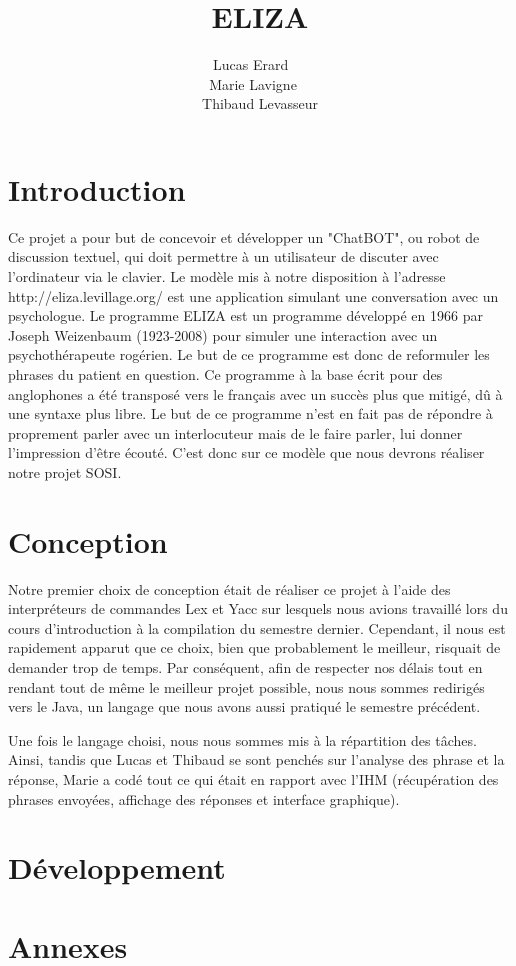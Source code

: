 \documentclass[a4paper,12pt]{article}
\title{ELIZA}
\author{Lucas Erard ~~\\ Marie Lavigne~~\\ Thibaud Levasseur}
\begin{document}
\maketitle
\newpage
\tableofcontents
\newpage
\section{Introduction}
Ce projet a pour but de concevoir et développer un "ChatBOT", ou robot de discussion textuel, qui doit permettre à un utilisateur de discuter avec l'ordinateur via le clavier. Le modèle mis à notre disposition à l'adresse http://eliza.levillage.org/ est une application simulant une conversation avec un psychologue.
Le programme ELIZA est un programme développé en 1966 par Joseph Weizenbaum (1923-2008) pour simuler une interaction avec un psychothérapeute rogérien. Le but de ce programme est donc de reformuler les phrases du patient en question.
Ce programme à la base écrit pour des anglophones a été transposé vers le français avec un succès  plus que mitigé, dû à une syntaxe plus libre.
Le but de ce programme n'est en fait pas de répondre à proprement parler avec un interlocuteur mais de le faire parler, lui donner l'impression d'être écouté.
C'est donc sur ce modèle que nous devrons réaliser notre projet SOSI.
\section{Conception}
Notre premier choix de conception était de réaliser ce projet à l'aide des interpréteurs de commandes Lex et Yacc sur lesquels nous avions travaillé lors du cours d'introduction à la compilation du semestre dernier. Cependant, il nous est rapidement apparut que ce choix, bien que probablement le meilleur, risquait de demander trop de temps. Par conséquent, afin de respecter nos délais tout en rendant tout de même le meilleur projet possible, nous nous sommes redirigés vers le Java, un langage que nous avons aussi pratiqué le semestre précédent. 

Une fois le langage choisi, nous nous sommes mis à la répartition des tâches. Ainsi, tandis que Lucas et Thibaud se sont penchés sur l'analyse des phrase et la réponse, Marie a codé tout ce qui était en rapport avec l'IHM (récupération des phrases envoyées, affichage des réponses et interface graphique). 
\section{Développement}
 
\section{Annexes}
\end{document}
